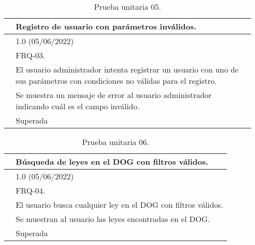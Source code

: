 \begin{table}[H]
\begin{center}
\begin{tabular}{|p{3cm}|p{10cm}|} \hline
\centering {\bf PU-05} & Registro de usuario con parámetros inválidos.  \\ \hline\hline
\centering {\bf Versión} & 1.0 (05/06/2022) \\ \hline
\centering {\bf Dependencias} & FRQ-03. \\ \hline
\centering {\bf Descripción} &  El usuario administrador intenta registrar un usuario con uno de sus parámetros con condiciones no válidas para el registro. \\ \hline
\centering {\bf Criterio de aceptación} & Se muestra un mensaje de error al usuario administrador indicando cuál es el campo inválido. \\ \hline
\centering {\bf Estado} & Superada \\ \hline
\end{tabular}
\caption{Prueba unitaria 05.}
\label{enlacePU5}
\end{center}
\end{table}

\begin{table}[H]
\begin{center}
\begin{tabular}{|p{3cm}|p{10cm}|} \hline
\centering {\bf PU-06} & Búsqueda de leyes en el DOG con filtros válidos.  \\ \hline\hline
\centering {\bf Versión} & 1.0 (05/06/2022) \\ \hline
\centering {\bf Dependencias} & FRQ-04. \\ \hline
\centering {\bf Descripción} &  El usuario busca cualquier ley en el DOG con filtros válidos. \\ \hline
\centering {\bf Criterio de aceptación} & Se muestran al usuario las leyes encontradas en el DOG. \\ \hline
\centering {\bf Estado} & Superada \\ \hline
\end{tabular}
\caption{Prueba unitaria 06.}
\label{enlacePU6}
\end{center}
\end{table}

